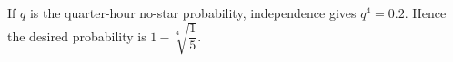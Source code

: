 If $q$ is the quarter-hour no-star probability, independence gives $q^4=0.2$. Hence the desired probability is $\boxed{1-\sqrt[4]{\dfrac{1}{5}}}$.
